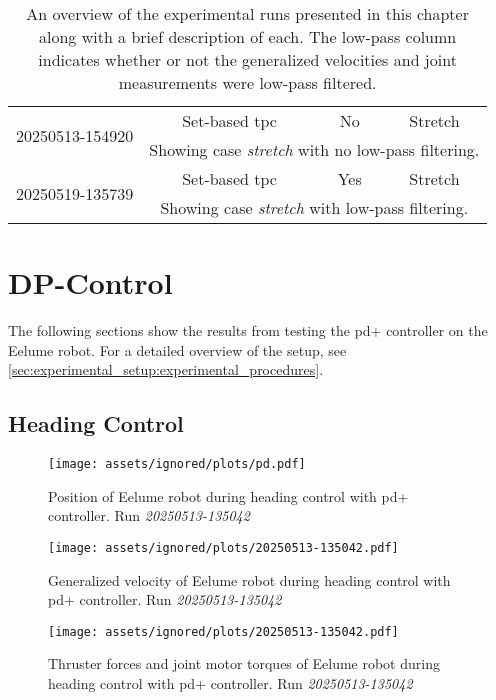 \begin{table}[!ht]
\begin{tabular}{|c|c|c|c|}
        \hline
        \multirow{2}{*}{20250513-154920} & Set-based \gls{tpc} & No & Stretch \\ \cline{2-4}
        & \multicolumn{3}{p{0.75\linewidth}|}{Showing case \textit{stretch} with no low-pass filtering.} \\ \hline
        \multirow{2}{*}{20250519-135739} & Set-based \gls{tpc} & Yes & Stretch \\ \cline{2-4}
        & \multicolumn{3}{p{0.75\linewidth}|}{Showing case \textit{stretch} with low-pass filtering.} \\ \hline
    \end{tabular}
    \caption[An overview of the experimental runs]{An overview of the experimental
    runs presented in this chapter along with a brief description of each.
    The low-pass column indicates whether or not the generalized velocities and joint measurements were low-pass filtered.}
    \label{tab:eelume:experimental-runs}
\end{table}

\section{DP-Control}

The following sections show the results from testing the \gls{pd+} controller
on the Eelume robot. For a detailed overview of the setup, see \autoref{sec:experimental_setup:experimental_procedures}.

\subsection{Heading Control}

\begin{figure}[!ht]
    \centering
    \texttt{[image: assets/ignored/plots/pd.pdf]}
    \caption{Position of Eelume robot during heading control with \gls{pd+} controller. Run \textit{20250513-135042}}
    \label{fig:results:dp_heading:pos}
\end{figure}
\begin{figure}[!ht]
    \centering
    \texttt{[image: assets/ignored/plots/20250513-135042.pdf]}
    \caption{Generalized velocity of Eelume robot during heading control with \gls{pd+} controller. Run \textit{20250513-135042}}
    \label{fig:results:dp_heading:vel}
\end{figure}
\begin{figure}[!ht]
    \centering
    \texttt{[image: assets/ignored/plots/20250513-135042.pdf]}
    \caption{Thruster forces and joint motor torques of Eelume robot during heading control with \gls{pd+} controller. Run \textit{20250513-135042}}
    \label{fig:results:dp_heading:forces2}
\end{figure}

